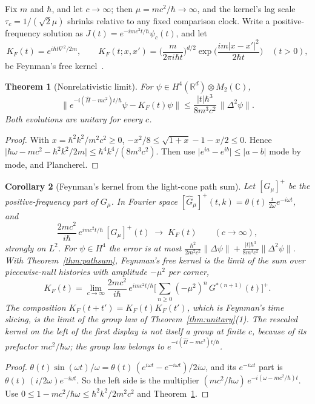 \documentclass[11pt]{amsart}
\newtheorem{theorem}{Theorem}[section]
\newtheorem{corollary}[theorem]{Corollary}
\theoremstyle{definition}
\theoremstyle{remark}
\begin{document}
Fix $m$ and $\hbar$, and let $c\to\infty$; then $\mu=mc^2/\hbar\to\infty$, and the kernel's lag scale $\tau_c=1/(\sqrt2\mu)$ shrinks relative to any fixed comparison clock. Write a positive-frequency solution as $J(t)=e^{-imc^2t/\hbar}\psi_c(t)$, and let
\[
K_F(t)=e^{i\hbar t\nabla^2/2m},\qquad K_F(t;x,x')=\Big(\frac{m}{2\pi i\hbar t}\Big)^{d/2}\exp\Big(\frac{im\lvert x-x'\rvert^2}{2\hbar t}\Big)\quad(t>0),
\]
be Feynman's free kernel~\cite{Feynman,FH}.

\begin{theorem}[Nonrelativistic limit]\label{thm:NR}
For $\psi\in H^4(\mathbb R^d)\otimes M_2(\mathbb C)$,
\[
\big\lVert e^{-i(\hat H-mc^2)t/\hbar}\psi-K_F(t)\psi\big\rVert\le\frac{\lvert t\rvert\hbar^3}{8m^3c^2}\,\lVert\Delta^2\psi\rVert .
\]
Both evolutions are unitary for every $c$.
\end{theorem}

\begin{proof}
With $x=\hbar^2k^2/m^2c^2\ge0$, $-x^2/8\le\sqrt{1+x}-1-x/2\le0$. Hence $\lvert\hbar\omega-mc^2-\hbar^2k^2/2m\rvert\le\hbar^4k^4/(8m^3c^2)$. Then use $\lvert e^{ia}-e^{ib}\rvert\le\lvert a-b\rvert$ mode by mode, and Plancherel.
\end{proof}

\begin{corollary}[Feynman's kernel from the light-cone path sum]\label{cor:feynman}
Let $[G_\mu]^+$ be the positive-frequency part of $G_\mu$. In Fourier space $[\hat G_\mu]^+(t,k)=\theta(t)\,\frac{i}{2\omega}e^{-i\omega t}$, and
\[
\frac{2mc^2}{i\hbar}\,e^{imc^2t/\hbar}\,[G_\mu]^+(t)\;\longrightarrow\;K_F(t)\qquad(c\to\infty),
\]
strongly on $L^2$. For $\psi\in H^4$ the error is at most $\frac{\hbar^2}{2m^2c^2}\lVert\Delta\psi\rVert+\frac{\lvert t\rvert\hbar^3}{8m^3c^2}\lVert\Delta^2\psi\rVert$. With Theorem~\ref{thm:pathsum}, Feynman's free kernel is the limit of the sum over piecewise-null histories with amplitude $-\mu^2$ per corner,
\[
K_F(t)=\lim_{c\to\infty}\frac{2mc^2}{i\hbar}\,e^{imc^2t/\hbar}\Big[\sum_{n\ge0}(-\mu^2)^n\,G^{*(n+1)}(t)\Big]^+ .
\]
The composition $K_F(t+t')=K_F(t)K_F(t')$, which is Feynman's time slicing, is the limit of the group law of Theorem~\ref{thm:unitary}(1). The rescaled kernel on the left of the first display is not itself a group at finite $c$, because of its prefactor $mc^2/\hbar\omega$; the group law belongs to $e^{-i(\hat H-mc^2)t/\hbar}$.
\end{corollary}

\begin{proof}
$\theta(t)\sin(\omega t)/\omega=\theta(t)\,(e^{i\omega t}-e^{-i\omega t})/2i\omega$, and its $e^{-i\omega t}$ part is $\theta(t)\,(i/2\omega)e^{-i\omega t}$. So the left side is the multiplier $(mc^2/\hbar\omega)\,e^{-i(\omega-mc^2/\hbar)t}$. Use $0\le1-mc^2/\hbar\omega\le\hbar^2k^2/2m^2c^2$ and Theorem~\ref{thm:NR}.
\end{proof}
\end{document}
